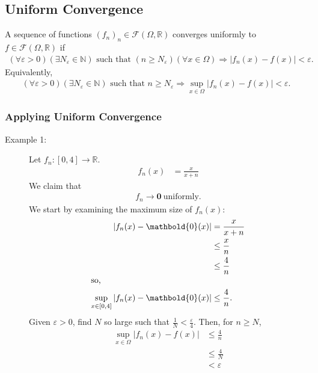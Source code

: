 \documentclass[10pt]{extarticle}
\renewcommand{\mathbf}[1]{\mathbold{#1}}
\newcommand{\N}{\mathbb{N}}
\newcommand{\R}{\mathbb{R}}
\begin{document}
  \subsection{Uniform Convergence}%
    A sequence of functions $(f_n)_n\in \mathcal{F}(\Omega,\R)$ converges uniformly to $f\in \mathcal{F}(\Omega,\R)$ if
    \begin{align*}
      (\forall \varepsilon > 0)(\exists N_{\varepsilon}\in\N) \text{ such that } \left(n \geq N_{\varepsilon}\right)  (\forall x \in \Omega)\Rightarrow \left|f_n(x) - f(x)\right| < \varepsilon.
    \end{align*}
    Equivalently,
    \begin{align*}
      (\forall \varepsilon > 0)(\exists N_{\varepsilon}\in \N) \text{ such that } n\geq N_{\varepsilon} \Rightarrow \sup_{x\in\Omega}\left|f_n(x) - f(x)\right| < \varepsilon.
    \end{align*}
    \subsubsection{Applying Uniform Convergence}%
    \begin{description}
      \item[Example 1:] Let $f_n: [0,4] \rightarrow \R$.
        \begin{align*}
          f_n(x) &= \frac{x}{x+n}
        \end{align*}
        We claim that
        \begin{align*}
          f_n \rightarrow \mathbf{0}~\text{uniformly}.
        \end{align*}
        We start by examining the maximum size of $f_n(x)$:
        \begin{align*}
          \left|f_n(x) - \mathbf{0}(x)\right| &= \frac{x}{x+n}\\
                                              &\leq \frac{x}{n}\\
                                              &\leq \frac{4}{n}\\
                                              \shortintertext{so,}
          \sup_{x\in[0,4]}\left|f_n(x)-\mathbf{0}(x)\right|&\leq \frac{4}{n}.
        \end{align*}
        Given $\varepsilon > 0$, find $N$ so large such that $\frac{1}{N} < \frac{\varepsilon}{4}$. Then, for $n \geq N$,
        \begin{align*}
          \sup_{x\in\Omega}\left|f_n(x) - f(x) \right| &\leq \frac{4}{n}\\
                                                       &\leq \frac{4}{N}\\
                                                       &< \varepsilon
        \end{align*}
    \end{description}
\end{document}

